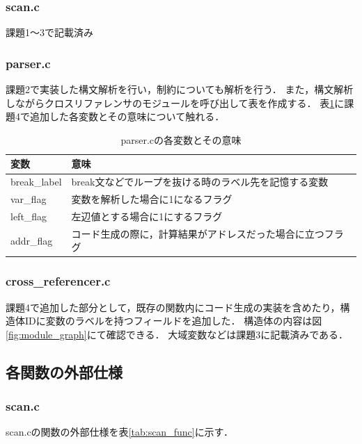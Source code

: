 \documentclass{jlreq}
\begin{document}
\subsubsection{scan.c}
課題1～3で記載済み

\subsubsection{parser.c}
課題2で実装した構文解析を行い，制約についても解析を行う．
また，構文解析しながらクロスリファレンサのモジュールを呼び出して表を作成する．
表\ref{tab:parser_design}に課題4で追加した各変数とその意味について触れる．

\begin{table}[H]
  \centering
  \caption{parser.cの各変数とその意味}
  \begin{tabular}{|l|p{10cm}|}
    \hline
    変数         & 意味                                                       \\ \hline
    break\_label & break文などでループを抜ける時のラベル先を記憶する変数      \\
    var\_flag    & 変数を解析した場合に1になるフラグ                          \\
    left\_flag   & 左辺値とする場合に1にするフラグ                            \\
    addr\_flag   & コード生成の際に，計算結果がアドレスだった場合に立つフラグ \\ \hline
  \end{tabular}
  \label{tab:parser_design}
\end{table}

\subsubsection{cross\_referencer.c}
課題4で追加した部分として，既存の関数内にコード生成の実装を含めたり，構造体IDに変数のラベルを持つフィールドを追加した．
構造体の内容は図\ref{fig:module_graph}にて確認できる．
大域変数などは課題3に記載済みである．

\subsection{各関数の外部仕様}

\subsubsection{scan.c}
scan.cの関数の外部仕様を表\ref{tab:scan_func}に示す．
\end{document}
